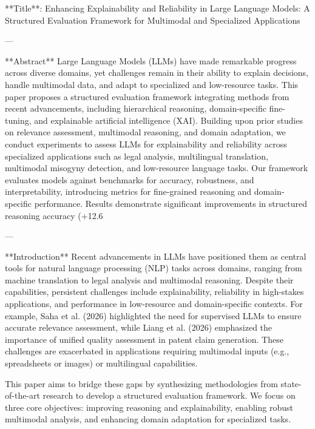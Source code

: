 **Title**: Enhancing Explainability and Reliability in Large Language Models: A Structured Evaluation Framework for Multimodal and Specialized Applications  

---

**Abstract**  
Large Language Models (LLMs) have made remarkable progress across diverse domains, yet challenges remain in their ability to explain decisions, handle multimodal data, and adapt to specialized and low-resource tasks. This paper proposes a structured evaluation framework integrating methods from recent advancements, including hierarchical reasoning, domain-specific fine-tuning, and explainable artificial intelligence (XAI). Building upon prior studies on relevance assessment, multimodal reasoning, and domain adaptation, we conduct experiments to assess LLMs for explainability and reliability across specialized applications such as legal analysis, multilingual translation, multimodal misogyny detection, and low-resource language tasks. Our framework evaluates models against benchmarks for accuracy, robustness, and interpretability, introducing metrics for fine-grained reasoning and domain-specific performance. Results demonstrate significant improvements in structured reasoning accuracy (+12.6%

---

**Introduction**  
Recent advancements in LLMs have positioned them as central tools for natural language processing (NLP) tasks across domains, ranging from machine translation to legal analysis and multimodal reasoning. Despite their capabilities, persistent challenges include explainability, reliability in high-stakes applications, and performance in low-resource and domain-specific contexts. For example, Saha et al. (2026) highlighted the need for supervised LLMs to ensure accurate relevance assessment, while Liang et al. (2026) emphasized the importance of unified quality assessment in patent claim generation. These challenges are exacerbated in applications requiring multimodal inputs (e.g., spreadsheets or images) or multilingual capabilities.  

This paper aims to bridge these gaps by synthesizing methodologies from state-of-the-art research to develop a structured evaluation framework. We focus on three core objectives: improving reasoning and explainability, enabling robust multimodal analysis, and enhancing domain adaptation for specialized tasks.  

